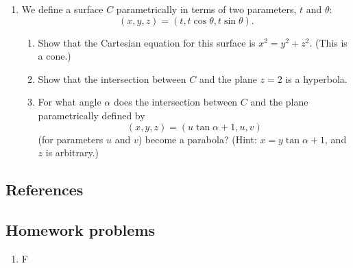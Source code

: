 \begin{enumerate}
\begin{enumerate}
    \end{enumerate}
  \item We define a surface $ C $ parametrically in terms of two parameters, $ t $ and $ \theta $:
        \begin{displaymath}
          (x,y,z) = (t, t \cos \theta, t \sin \theta).
        \end{displaymath}
    \begin{enumerate}
      \item Show that the Cartesian equation for this surface is $ x^2 = y^2 + z^2 $. (This is a cone.)
      \item Show that the intersection between $ C $ and the plane $ z = 2 $ is a hyperbola.
      \item For what angle $ \alpha $ does the intersection between $ C $ and the plane parametrically defined by
            \begin{displaymath}
              (x,y,z) = (u\tan \alpha + 1, u, v)
            \end{displaymath}
            (for parameters $ u $ and $ v $) become a parabola? (Hint: $ x = y \tan \alpha + 1 $, and $ z $ is arbitrary.)
    \end{enumerate}
\end{enumerate}

\subsection{References}

\subsection{Homework problems}
\begin{enumerate}
  \item F
\end{enumerate}
